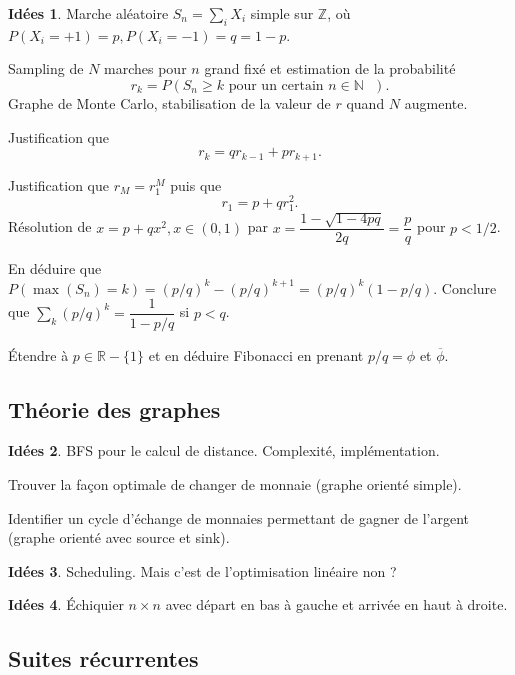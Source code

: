 \documentclass[a4paper,12pt, notitlepage]{article}
\theoremstyle{definition}
\newtheorem{idee}{Idées}
\newcommand{\N}{\mathbb{N}}
\newcommand{\R}{\mathbb{R}}
\begin{document}
\begin{idee}
	Marche aléatoire $S_n = \sum_i X_i$ simple sur $\mathbb{Z}$, où $P(X_i = +1) = p, P(X_i = -1) = q = 1-p$.
	
	Sampling de $N$ marches pour $n$ grand fixé et estimation de la probabilité
		\[ r_k = P(S_n \geq k \text{ pour un certain $n\in\N$ }). \]
	Graphe de Monte Carlo, stabilisation de la valeur de $r$ quand $N$ augmente.
	
	Justification que 
		\[ r_k = q r_{k-1} + p r_{k+1}. \]
		
	Justification que $r_M = r_1^M$ puis que
		\[ r_1 = p + q r_1^2. \]
	Résolution de $x = p + qx^2, x \in (0,1)$ par $x = \dfrac{1-\sqrt{1-4pq}}{2q} = \dfrac{p}{q}$ pour $p<1/2$.
	
	En déduire que $P(\max(S_n) = k) = (p/q)^k - (p/q)^{k+1} = (p/q)^k (1-p/q)$. 
	Conclure que $\sum_k (p/q)^k = \dfrac{1}{1-p/q}$ si $p<q$.
	
	Étendre à $p \in\R-\{1\}$ et en déduire Fibonacci en prenant $p/q = \phi$ et $\overline{\phi}$.
\end{idee}


\subsection{Théorie des graphes}

\begin{idee}
	BFS pour le calcul de distance. Complexité, implémentation.
	
	Trouver la façon optimale de changer de monnaie (graphe orienté simple).
	
	Identifier un cycle d'échange de monnaies permettant de gagner de l'argent (graphe orienté avec source et sink).
\end{idee}

\begin{idee}
	Scheduling. Mais c'est de l'optimisation linéaire non ?
\end{idee}

\begin{idee}
	Échiquier $n \times n$ avec départ en bas à gauche et arrivée en haut à droite.
	
\end{idee}

\subsection{Suites récurrentes}
\end{document}
